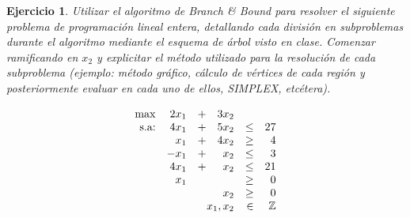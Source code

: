\documentclass[a4paper,oneside,12pt]{amsart}
\newtheorem{quest}{Ejercicio}
\begin{document}
\begin{quest} 
Utilizar el algoritmo de Branch \& Bound para resolver el siguiente problema de programaci\'on lineal entera, detallando cada divisi\'on en subproblemas durante el algoritmo mediante el esquema de \'arbol visto en clase. Comenzar ramificando en $x_2$ y explicitar el m\'etodo utilizado para la resoluci\'on de cada subproblema (ejemplo: m\'etodo gr\'afico, c\'alculo de v\'ertices de cada regi\'on y posteriormente evaluar en cada uno de ellos, SIMPLEX, etc\'etera). 

\[\begin{array}{rrrrrrrrc}
\max & 2x_1 & + & 3x_2 &  &   \\
\text{s.a:}	 & 4x_1 & + & 5x_2 & \leq & 27  \\
			 & x_1 & + & 4x_2 & \geq & 4 \\
			 &-x_1 & +  & x_2 & \leq & 3 \\
			 &	4x_1    & +  & x_2 & \leq & 21 \\
			 &	x_1    &  & & \geq & 0 \\
			 & & & x_2 & \geq & 0 \\
			 & \multicolumn{3}{r}{x_1,x_2} & \in & \mathbb{Z} 
\end{array}
\]



\end{quest}


\end{document}
